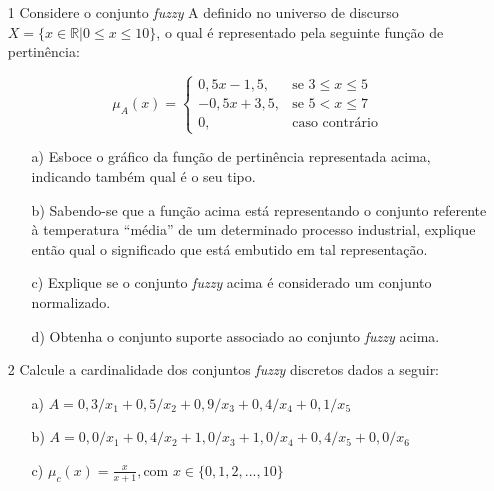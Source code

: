 \documentclass{report}
\begin{document}
\newpage

\begin{enumerate}

\item[1] Considere o conjunto \emph{fuzzy} A definido no universo de discurso $X = \{ x \in  \mathbb{R} \vert 0 \le x \le 10\}$,
o qual é representado pela seguinte função de pertinência:


\begin{equation*}
\mu_A (x) = 
\begin{cases} 
0,5x-1,5, & \text{se $3 \leq x \leq 5$}
\\
-0,5x+3,5, & \text{se $5 < x \leq 7$}
\\
0, &\text{caso contrário}
\end{cases}
\end{equation*}

\begin{enumerate}
    \item[a)] Esboce o gráfico da função de pertinência representada acima, indicando também qual é o seu tipo.
    \item[b)] Sabendo-se que a função acima está representando o conjunto referente à temperatura ``média'' de um determinado
    processo industrial, explique então qual o significado que está embutido em tal representação.
    \item[c)] Explique se o conjunto \emph{fuzzy} acima é considerado um conjunto normalizado.
    \item[d)] Obtenha o conjunto suporte associado ao conjunto \emph{fuzzy} acima.
\end{enumerate}

\item[2] Calcule a cardinalidade dos conjuntos \emph{fuzzy} discretos dados a seguir:
\begin{enumerate}
    \item[a)] $A = 0,3/x_1 + 0,5/x_2 + 0,9/x_3 + 0,4/x_4 + 0,1/x_5$
    \item[b)] $A = 0,0/x_1 + 0,4/x_2 + 1,0/x_3 + 1,0/x_4 + 0,4/x_5 + 0,0/x_6$
    \item[c)] $\mu_c(x)=\frac{x}{x+1}, \text{com } x \in \{0,1,2,...,10 \}$
\end{enumerate}





\end{enumerate}
\end{document}
